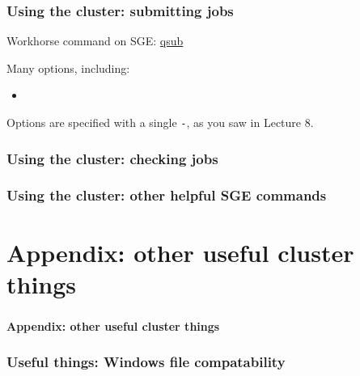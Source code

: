 \documentclass[12pt, 
hyperref={colorlinks=true, linkcolor=BlueViolet, urlcolor=BlueViolet},dvipsnames]{beamer}
\begin{document}
\begin{frame}
\frametitle{Using the cluster: submitting jobs}
Workhorse command on SGE: \href{http://gridscheduler.sourceforge.net/htmlman/htmlman1/qsub.html}{qsub}

Many options, including: \vspace{-0.3cm} \pause
\begin{itemize}
\item 
\end{itemize}

Options are specified with a single \texttt{-}, as you saw in Lecture 8.
\end{frame}

\begin{frame}
\frametitle{Using the cluster: checking jobs}

\end{frame}

\begin{frame}
\frametitle{Using the cluster: other helpful SGE commands}
\end{frame}

\section*{Appendix: other useful cluster things}
\begin{frame}
\frametitle{}
\begin{center}
{\large \textbf{Appendix: other useful cluster things}}
\end{center}
\end{frame}
\begin{frame}
\frametitle{Useful things: Windows file compatability}
\end{frame}
\end{document}
